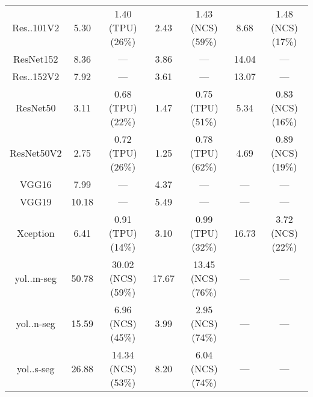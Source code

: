 \begin{tabular}{c|cc|cc|cc}
        Res..101V2 & 5.30 & 1.40 (\colorbox{RC}{TPU}) (\colorbox{RC}{26\%}) & 2.43 & 1.43 (\colorbox{RA}{NCS}) (\colorbox{RC}{59\%}) & 8.68 & 1.48 (\colorbox{RA}{NCS}) (\colorbox{RC}{17\%}) \\
        ResNet152 & 8.36 & --- & 3.86 & --- & 14.04 & --- \\
        Res..152V2 & 7.92 & --- & 3.61 & --- & 13.07 & --- \\
        ResNet50 & 3.11 & 0.68 (\colorbox{RC}{TPU}) (\colorbox{RC}{22\%}) & 1.47 & 0.75 (\colorbox{RC}{TPU}) (\colorbox{RC}{51\%}) & 5.34 & 0.83 (\colorbox{RA}{NCS}) (\colorbox{RC}{16\%}) \\
        ResNet50V2 & 2.75 & 0.72 (\colorbox{RC}{TPU}) (\colorbox{RC}{26\%}) & 1.25 & 0.78 (\colorbox{RC}{TPU}) (\colorbox{RE}{62\%}) & 4.69 & 0.89 (\colorbox{RA}{NCS}) (\colorbox{RC}{19\%}) \\
        VGG16 & 7.99 & --- & 4.37 & --- & --- & --- \\
        VGG19 & 10.18 & --- & 5.49 & --- & --- & --- \\
        Xception & 6.41 & 0.91 (\colorbox{RC}{TPU}) (\colorbox{RA}{14\%}) & 3.10 & 0.99 (\colorbox{RC}{TPU}) (\colorbox{RC}{32\%}) & 16.73 & 3.72 (\colorbox{RA}{NCS}) (\colorbox{RC}{22\%}) \\
        yol..m-seg & 50.78 & 30.02 (\colorbox{RA}{NCS}) (\colorbox{RC}{59\%}) & 17.67 & 13.45 (\colorbox{RA}{NCS}) (\colorbox{RE}{76\%}) & --- & --- \\
        yol..n-seg & 15.59 & 6.96 (\colorbox{RA}{NCS}) (\colorbox{RC}{45\%}) & 3.99 & 2.95 (\colorbox{RA}{NCS}) (\colorbox{RE}{74\%}) & --- & --- \\
        yol..s-seg & 26.88 & 14.34 (\colorbox{RA}{NCS}) (\colorbox{RC}{53\%}) & 8.20 & 6.04 (\colorbox{RA}{NCS}) (\colorbox{RE}{74\%}) & --- & --- \\
    \end{tabular}
